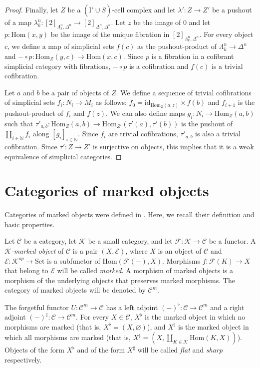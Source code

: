 \documentclass[reqno]{amsart}
\theoremstyle{definition}
\theoremstyle{remark}
\newcommand{\fs}[1]{\mathrm{#1}}
\newcommand{\Hom}{\fs{Hom}}
\newcommand{\cat}[1]{\mathcal{#1}}
\newcommand{\C}{\cat{C}}
\newcommand{\K}{\cat{K}}
\newcommand{\id}{\fs{id}}
\newcommand{\Set}{\fs{Set}}
\newcommand{\I}{\fs{I}}
\newcommand{\class}[2]{#1\text{-}\mathrm{#2}}
\newcommand{\Icell}[1][\I]{\class{#1}{cell}}
\numberwithin{figure}{section}
\begin{document}
\begin{proof}
Finally, let $Z$ be a $\Icell[(\I^\flat \cup S)]$ complex and let $\lambda' : Z \to Z'$ be a pushout of a map $\lambda^n_k : [2]_{\Lambda^n_k,\Delta^n} \to [2]_{\Delta^n,\Delta^n}$.
Let $z$ be the image of $0$ and let $p : \Hom(x,y)$ be the image of the unique fibration in $[2]_{\Lambda^n_k,\Delta^n}$.
For every object $c$, we define a map of simplicial sets $f(c)$ as the pushout-product of $\Lambda^n_k \to \Delta^n$ and $- \circ p : \Hom_Z(y,c) \to \Hom(x,c)$.
Since $p$ is a fibration in a cofibrant simplicial category with fibrations, $- \circ p$ is a cofibration and $f(c)$ is a trivial cofibration.

Let $a$ and $b$ be a pair of objects of $Z$.
We define a sequence of trivial cofibrations of simplicial sets $f_i : N_i \to M_i$ as follows:
$f_0 = \id_{\Hom_Z(a,z)} \times f(b)$ and $f_{i+1}$ is the pushout-product of $f_i$ and $f(z)$.
We can also define maps $g_i : N_i \to \Hom_Z(a,b)$ such that $\tau'_{a,b} : \Hom_Z(a,b) \to \Hom_{Z'}(\tau'(a),\tau'(b))$ is the pushout of $\coprod_{i \in \mathbb{N}} f_i$ along $[g_i]_{i \in \mathbb{N}}$.
Since $f_i$ are trivial cofibrations, $\tau'_{a,b}$ is also a trivial cofibration.
Since $\tau' : Z \to Z'$ is surjective on objects, this implies that it is a weak equivalence of simplicial categories.
\end{proof}

\section{Categories of marked objects}

Categories of marked objects were defined in \cite{marked-obj}.
Here, we recall their definition and basic properties.

\begin{defn}
Let $\C$ be a category, let $\mathcal{K}$ be a small category, and let $\mathcal{F} : \mathcal{K} \to \C$ be a functor.
A \emph{$\K$-marked object} of $\C$ is a pair $(X,\mathcal{E})$, where $X$ is an object of $\C$ and $\mathcal{E} : \mathcal{K}^{op} \to \Set$ is a subfunctor of $\Hom(\mathcal{F}(-),X)$.
Morphisms $f : \mathcal{F}(K) \to X$ that belong to $\mathcal{E}$ will be called \emph{marked}.
A morphism of marked objects is a morphism of the underlying objects that preserves marked morphisms.
The category of marked objects will be denoted by $\C^m$.
\end{defn}

The forgetful functor $U : \C^m \to \C$ has a left adjoint $(-)^\flat : \C \to \C^m$ and a right adjoint $(-)^\sharp : \C \to \C^m$.
For every $X \in \C$, $X^\flat$ is the marked object in which no morphisms are marked (that is, $X^\flat = (X,\varnothing)$),
and $X^\sharp$ is the marked object in which all morphisms are marked (that is, $X^\sharp = (X,\coprod_{K \in \mathcal{K}} \Hom(K,X))$).
Objects of the form $X^\flat$ and of the form $X^\sharp$ will be called \emph{flat} and \emph{sharp} respectively.
\end{document}
